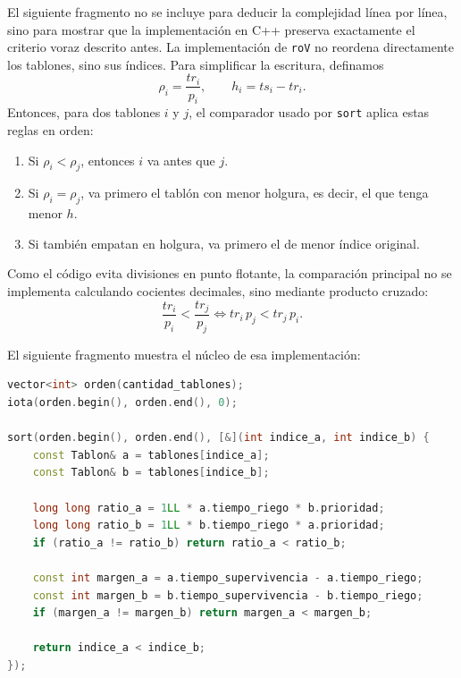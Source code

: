 \documentclass[12pt,a4paper]{article}
\begin{document}
El siguiente fragmento no se incluye para deducir la complejidad l\'inea por l\'inea, sino para mostrar que la implementaci\'on en C++ preserva exactamente el criterio voraz descrito antes. La implementaci\'on de \texttt{roV} no reordena directamente los tablones, sino sus \'indices. Para simplificar la escritura, definamos
\[
\rho_i=\frac{tr_i}{p_i},
\qquad
h_i=ts_i-tr_i.
\]
Entonces, para dos tablones \(i\) y \(j\), el comparador usado por \texttt{sort} aplica estas reglas en orden:
\begin{enumerate}
  \item Si \(\rho_i<\rho_j\), entonces \(i\) va antes que \(j\).
  \item Si \(\rho_i=\rho_j\), va primero el tabl\'on con menor holgura, es decir, el que tenga menor \(h\).
  \item Si tambi\'en empatan en holgura, va primero el de menor \'indice original.
\end{enumerate}

Como el c\'odigo evita divisiones en punto flotante, la comparaci\'on principal no se implementa calculando cocientes decimales, sino mediante producto cruzado:
\[
\frac{tr_i}{p_i}<\frac{tr_j}{p_j}
\iff
tr_i\,p_j < tr_j\,p_i.
\]

El siguiente fragmento muestra el n\'ucleo de esa implementaci\'on:

\begin{lstlisting}[language=C++]
vector<int> orden(cantidad_tablones);
iota(orden.begin(), orden.end(), 0);

sort(orden.begin(), orden.end(), [&](int indice_a, int indice_b) {
    const Tablon& a = tablones[indice_a];
    const Tablon& b = tablones[indice_b];

    long long ratio_a = 1LL * a.tiempo_riego * b.prioridad;
    long long ratio_b = 1LL * b.tiempo_riego * a.prioridad;
    if (ratio_a != ratio_b) return ratio_a < ratio_b;

    const int margen_a = a.tiempo_supervivencia - a.tiempo_riego;
    const int margen_b = b.tiempo_supervivencia - b.tiempo_riego;
    if (margen_a != margen_b) return margen_a < margen_b;

    return indice_a < indice_b;
});
\end{lstlisting}
\end{document}
